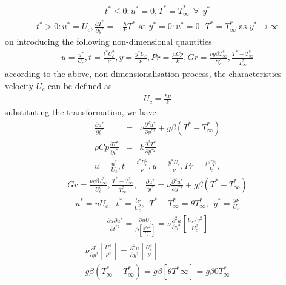 \documentclass[11pt]{report}
\newcommand{\sps}{\\[0.2cm]}
\begin{document}
	\begin{eqnarray*}
		t^* \leq 0 : u^* = 0, T^* = T^*_\infty ~~\forall~~ y^*
	\end{eqnarray*}
	\begin{eqnarray*}
		t^* > 0 : u^* = U_c, \frac{\partial T^*}{\partial y^*} = -\frac{h}{k}T^* \text{ at } y^* = 0 : u^* = 0~~~ T^* = T^*_\infty \text{ as } y^* \rightarrow \infty
	\end{eqnarray*}
	on introducing the following non-dimensional quantities
	\begin{eqnarray*}
		u=\frac{u^*}{U_c}, t=\frac{t^*U_c^2}{\nu}, y=\frac{y^* U_c}{\nu}, Pr=\frac{\mu Cp}{k}, Gr=\frac{\nu g\beta T_\infty^*}{U_c^3}, \frac{T^* - T^*_\infty}{T^*_\infty}
	\end{eqnarray*}
	according to the above, non-dimensionalisation process, the characteristics velocity $U_c$ can be defined as
	\begin{eqnarray*}
		U_c = \frac{h\nu}{k}
	\end{eqnarray*}
	substituting the transformation, we have
	\begin{eqnarray}
		\frac{\partial u^*}{\partial t^*}&=& \nu\frac{\partial^2 u^*}{\partial y^{*2}} + g\beta(T^*-T^*_\infty)\label{eq:2_31}\sps
		\rho Cp\frac{\partial T^*}{\partial t^*} &=& k\frac{\partial^2 T^*}{\partial y^{*2}}\label{eq:2_32}
	\end{eqnarray}
	\begin{eqnarray*}
		u=\frac{u^*}{U_c}, t=\frac{t^* U_c^2}{\nu}, y=\frac{y^* U_c}{\nu}, Pr=\frac{\mu Cp}{k},
	\end{eqnarray*}
	\begin{eqnarray*}
		Gr=\frac{\nu g\beta T_\infty^*}{U_c^3}, \frac{T^* - T^*_\infty}{T^*_\infty}, ~~~~\frac{\partial u^*}{\partial t^*} = \nu\frac{\partial^2 u^*}{\partial y^{*2}} + g\beta(T^*-T^*_\infty)
	\end{eqnarray*}
	\begin{eqnarray*}
		u^* = uU_c, ~~ t^* = \frac{t\nu}{U_c^2}, ~~ T^*-T^*_\infty = \theta T^*_\infty, ~~ y^* = \frac{y\nu}{U_c}
	\end{eqnarray*}
	\begin{eqnarray*}
		\frac{\partial u\partial u^*}{\partial t^{*2}} = \frac{\partial u U_c}{\partial \left[\frac{y^2 \nu^2}{U_c^2}\right]}= \nu\frac{\partial^2 u}{\partial y^2}\left[\frac{U_c/v^2}{U_c^2}\right]
	\end{eqnarray*}
	\begin{eqnarray*}
		\begin{gathered}
			\nu\frac{\partial^2}{\partial y^2}\left[\frac{U_c^3}{\nu^2}\right] = \frac{\partial^2 u}{\partial y^2}\left[\frac{U_c^3}{\nu}\right]\sps
			g\beta(T^*_\infty - T^*_\infty) = g\beta[\theta T^*\infty] = g\beta0T^*_\infty
		\end{gathered}
	\end{eqnarray*}
\end{document}
